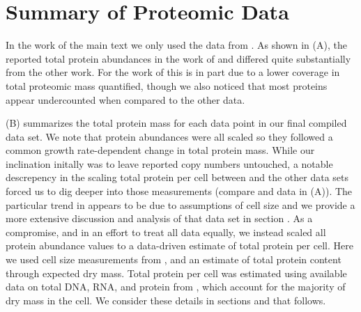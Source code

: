 \section{Summary of Proteomic Data}
\label{sec:SI_data_summary}

In the work of the main text we only used the data from \cite{valgepea2013,
li2014, peebo2015, schmidt2016}. As shown in (A), the
reported total protein abundances in the work of \cite{taniguchi2010} and
\cite{soufi2015} differed quite substantially from the other work. For the work
of \cite{taniguchi2010} this is in part due to a lower coverage in total
proteomic mass quantified, though we also noticed that most proteins appear
undercounted when compared to the other data.

(B) summarizes the total protein mass for each data
point in our final compiled data set. We note that protein abundances were all
scaled so they followed a common growth rate-dependent change in total protein
mass.  While our inclination initally was to leave reported copy numbers
untouched,  a notable descrepency in the scaling total protein per cell between
\cite{schmidt2016} and the other data sets forced us to dig deeper into those
measurements (compare \cite{schmidt2016} and \cite{li2014} data in
(A)). The particular trend in \cite{schmidt2016}
appears to be due to assumptions of cell size and we provide a more extensive
discussion and analysis of that data set in section . As
a compromise, and in an effort to treat all data equally, we instead scaled all
protein abundance values to a data-driven estimate of total protein per cell.
Here we used cell size measurements from \cite{si2017, si2019}, and an estimate
of total protein content through expected dry mass. Total protein per cell was
estimated using available data on total DNA, RNA, and protein from
\cite{basan2015, dai2016}, which  account for the majority of dry mass in the
cell. We consider these details in sections  and
 that follows.

